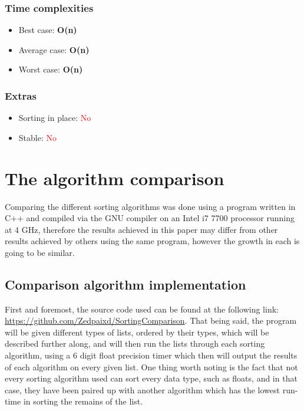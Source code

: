 \documentclass{article}
\begin{document}
\begin{multicols}{2}
\subsubsection{Time complexities}
\begin{itemize}
    \item Best case: \textbf{O(n)}
    \item Average case: \textbf{O(n)}
    \item Worst case: \textbf{O(n)}
\end{itemize}

\subsubsection{Extras}
\begin{itemize}
    \item Sorting in place: \textcolor{red}{No}
    \item Stable: \textcolor{red}{No}
\end{itemize}

\bigbreak \bigbreak \bigbreak \bigbreak \bigbreak \bigbreak \bigbreak \bigbreak \bigbreak \bigbreak \bigbreak \bigbreak \bigbreak \bigbreak \bigbreak \bigbreak \bigbreak \bigbreak \bigbreak \bigbreak


\end{multicols}
\pagebreak


\section{The algorithm comparison}
Comparing the different sorting algorithms was done using a program written in C++ and compiled via the GNU compiler on an Intel i7 7700 processor running at 4 GHz, therefore the results achieved in this paper may differ from other results achieved by others using the same program, however the growth in each is going to be similar. 
\subsection{Comparison algorithm implementation}
First and foremost, the source code used can be found at the following link:  \href{https://github.com/Zedpaixd/SortingComparison}{https://github.com/Zedpaixd/SortingComparison}. That being said, the program will be given different types of lists, ordered by their types, which will be described further along, and will then run the lists through each sorting algorithm, using a 6 digit float precision timer which then will output the results of each algorithm on every given list. One thing worth noting is the fact that not every sorting algorithm used can sort every data type, such as floats, and in that case, they have been paired up with another algorithm which has the lowest run-time in sorting the remains of the list.
\end{document}
